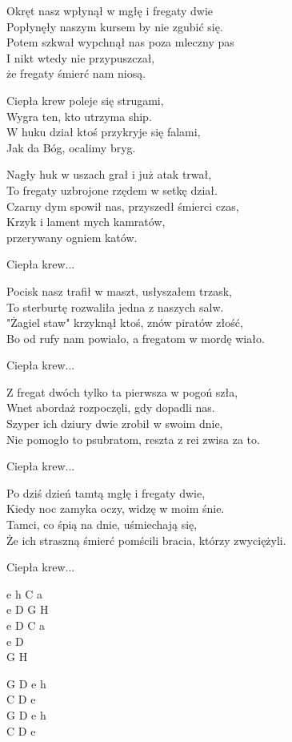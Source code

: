 \begin{text}
   
    Okręt nasz wpłynął w mgłę i fregaty dwie\\
    Popłynęły naszym kursem by nie zgubić się.\\
    Potem szkwał wypchnął nas poza mleczny pas\\
    I nikt wtedy nie przypuszczał,\\
	że fregaty śmierć nam niosą.

    \vin Ciepła krew poleje się strugami,\\
    \vin Wygra ten, kto utrzyma ship.\\
    \vin W huku dział ktoś przykryje się falami,\\
    \vin Jak da Bóg, ocalimy bryg.

    Nagły huk w uszach grał i już atak trwał,\\
    To fregaty uzbrojone rzędem w setkę dział.\\
    Czarny dym spowił nas, przyszedł śmierci czas,\\
    Krzyk i lament mych kamratów,\\
	przerywany ogniem katów.

    \vin Ciepła krew...

    Pocisk nasz trafił w maszt, usłyszałem trzask,\\
    To sterburtę rozwaliła jedna z naszych salw.\\
    "Żagiel staw" krzyknął ktoś, znów piratów złość,\\
    Bo od rufy nam powiało, a fregatom w mordę wiało.

    \vin Ciepła krew...

    Z fregat dwóch tylko ta pierwsza w pogoń szła,\\
    Wnet abordaż rozpoczęli, gdy dopadli nas.\\
    Szyper ich dziury dwie zrobił w swoim dnie,\\
    Nie pomogło to psubratom, reszta z rei zwisa za to.

    \vin Ciepła krew...

    Po dziś dzień tamtą mgłę i fregaty dwie,\\
    Kiedy noc zamyka oczy, widzę w moim śnie.\\
    Tamci, co śpią na dnie, uśmiechają się,\\
    Że ich straszną śmierć pomścili bracia, którzy zwyciężyli.

    \vin Ciepła krew...   

\end{text}
\begin{chord}
    e h C a\\
    e D G H\\
    e D C a\\
    e D\\
	G H

    G D e h\\
    C D e\\
    G D e h\\
    C D e

\end{chord}